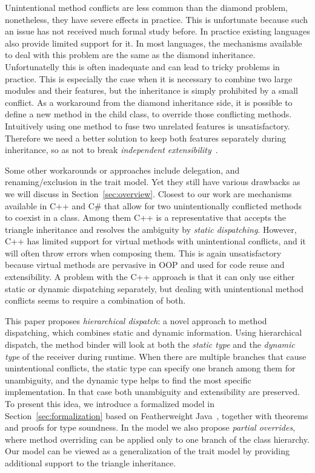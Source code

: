 Unintentional method conflicts are less common than the diamond
problem, nonetheless, they have severe effects in practice. This is
unfortunate because such an issue has not received much formal study 
before. In practice existing languages also provide limited support for
it. In most languages, the mechanisms available to deal with this problem are the same as the diamond
inheritance. Unfortunatelly this is often inadequate and can lead 
to tricky problems in practice. This is especially the case
when it is necessary to combine two large modules and their features,
but the inheritance is simply prohibited by a small conflict. As
a workaround from the diamond inheritance side, it is possible to
define a new method in the child class, to override those conflicting
methods. Intuitively using one method to fuse two unrelated features
is unsatisfactory. Therefore we need a better solution to keep both
features separately during inheritance, so as not to break
\emph{independent extensibility}~\cite{zenger05independentlyextensible}.

Some other workarounds or approaches include delegation, and
renaming/exclusion in the trait model. Yet they still have various
drawbacks as we will discuss in Section~\ref{sec:overview}. Closest to our work
are mechanisms available in C++ and C\# that allow for two
unintentionally conflicted methods to coexist in a class. Among them
C++ is a representative that accepts the triangle inheritance and
resolves the ambiguity by \emph{static dispatching}. However, C++ has
limited support for virtual methods with unintentional conflicts, and
it will often throw errors when composing them. This is again
unsatisfactory because virtual methods are pervasive in OOP and used 
for code reuse and extensibility. A problem with the C++ approach is
that it can only use either static or dynamic dispatching separately, but dealing
with unintentional method conflicts seems to require a combination of both. 


This paper proposes \textit{hierarchical dispatch}: a novel approach
to method dispatching, which combines static and dynamic
information. Using hierarchical dispatch, the method binder will look
at both the \emph{static type} and the \emph{dynamic type} of the
receiver during runtime. When there are multiple branches that cause
unintentional conflicts, the static type can specify one branch among
them for unambiguity, and the dynamic type helps to find the most
specific implementation. In that case both unambiguity and
extensibility are preserved. To present this idea, we introduce a
formalized model in Section~\ref{sec:formalization} based on
Featherweight Java~\cite{Igarashi01FJ}, together with theorems and
proofs for type soundness. In the model we also propose
\textit{partial overrides}, where method overriding can be applied
only to one branch of the class hierarchy. Our model can be viewed as
a generalization of the trait model by providing additional support to
the triangle inheritance.

